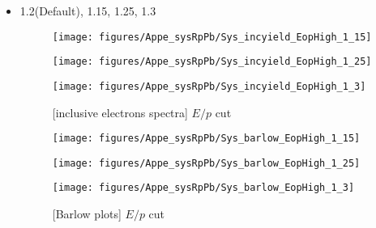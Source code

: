  \begin{itemize}
      \item 1.2(Default), 1.15, 1.25, 1.3
      
            \begin{figure}[H]
      	\begin{minipage}{0.33\hsize} 
      	\begin{center}
      	\texttt{[image: figures/Appe\_sysRpPb/Sys\_incyield\_EopHigh\_1\_15]}
      	\end{center}
      	\end{minipage}
      	\begin{minipage}{0.33\hsize} 
      	\begin{center}
      	\texttt{[image: figures/Appe\_sysRpPb/Sys\_incyield\_EopHigh\_1\_25]}
      	\end{center}
      	\end{minipage}
      	\begin{minipage}{0.33\hsize} 
      	\begin{center}
      	\texttt{[image: figures/Appe\_sysRpPb/Sys\_incyield\_EopHigh\_1\_3]}
      	\end{center}
      	\end{minipage}
      \caption{[inclusive electrons spectra] $E/p$ cut}
      \label{fig:Sys_EopHigh}
      \end{figure}
      
      \begin{figure}[H]
      	\begin{minipage}{0.33\hsize} 
      	\begin{center}
      	\texttt{[image: figures/Appe\_sysRpPb/Sys\_barlow\_EopHigh\_1\_15]}
      	\end{center}
      	\end{minipage}
      	\begin{minipage}{0.33\hsize} 
      	\begin{center}
      	\texttt{[image: figures/Appe\_sysRpPb/Sys\_barlow\_EopHigh\_1\_25]}
      	\end{center}
      	\end{minipage}
      	\begin{minipage}{0.33\hsize} 
      	\begin{center}
      	\texttt{[image: figures/Appe\_sysRpPb/Sys\_barlow\_EopHigh\_1\_3]}
      	\end{center}
      	\end{minipage}
      \caption{[Barlow plots] $E/p$ cut}
      \label{fig:Sys_EopHigh}
      \end{figure}
      
 \end{itemize}
 
